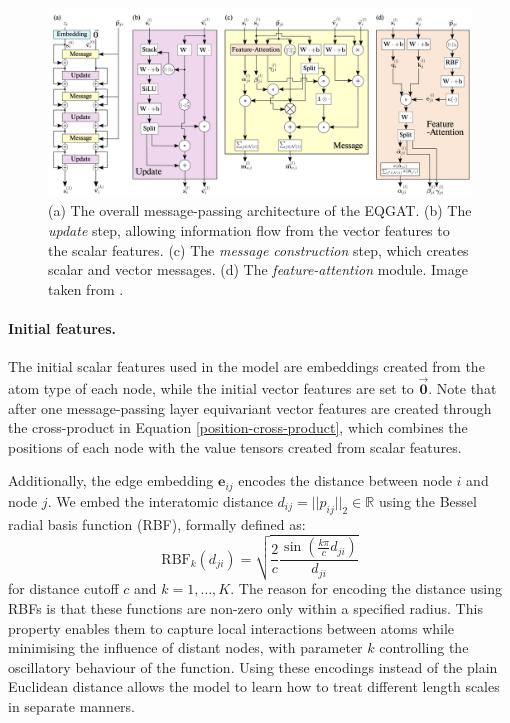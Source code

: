 \begin{figure}
    \centering
    \includegraphics[width=\textwidth]{masters-report/figures/eqgat_diagram.png}
    \caption{(a) The overall message-passing architecture of the EQGAT. (b) The \textit{update} step, allowing information flow from the vector features to the scalar features. (c) The \textit{message construction} step, which creates scalar and vector messages. (d) The \textit{feature-attention} module. Image taken from \cite{eqgat}. }
    \label{eqgat}
\end{figure}

\paragraph{Initial features.}
The initial scalar features used in the model are embeddings created from the atom type of each node, while the initial vector features are set to $\vec{\mathbf{0}}$. Note that after one message-passing layer equivariant vector features are created through the cross-product in Equation \ref{position-cross-product}, which combines the positions of each node with the value tensors created from scalar features. 

Additionally, the edge embedding $\mathbf{e}_{ij}$ encodes the distance between node $i$ and node $j$. We embed the interatomic distance $d_{ij} = ||p_{ij}||_2 \in \mathbb{R}$ using the Bessel radial basis function (RBF), formally defined as:
\begin{equation}
    \text{RBF}_k(d_{ji}) = \sqrt{\frac{2}{c}\frac{\sin(\frac{k\pi}{c}d_{ji})}{d_{ji}}}
\end{equation}
for distance cutoff $c$ and $k = 1, \dots, K$. The reason for encoding the distance using RBFs is that these functions are non-zero only within a specified radius. This property enables them to capture local interactions between atoms while minimising the influence of distant nodes, with parameter $k$ controlling the oscillatory behaviour of the function. Using these encodings instead of the plain Euclidean distance allows the model to learn how to treat different length scales in separate manners. 

